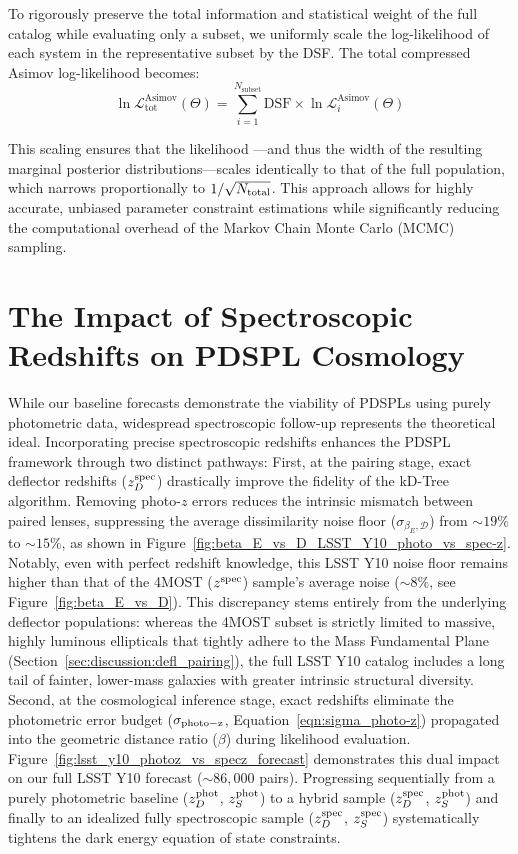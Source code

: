 \documentclass[a4paper,11pt]{article}
\begin{document}
\begin{appendix}
To rigorously preserve the total information and statistical weight of the full catalog while evaluating only a subset, we uniformly scale the log-likelihood of each system in the representative subset by the DSF. The total compressed Asimov log-likelihood becomes:
\begin{equation}
    \ln \mathcal{L}_{\text{tot}}^{\text{Asimov}}(\Theta) = \sum_{i=1}^{N_{\text{subset}}} \mathrm{DSF} \times \ln \mathcal{L}_i^{\text{Asimov}}(\Theta)
\end{equation}

This scaling ensures that the likelihood —and thus the width of the resulting marginal posterior distributions—scales identically to that of the full population, which narrows proportionally to $1/\sqrt{N_{\rm total}}$. This approach allows for highly accurate, unbiased parameter constraint estimations while significantly reducing the computational overhead of the Markov Chain Monte Carlo (MCMC) sampling.

\section{The Impact of Spectroscopic Redshifts on PDSPL Cosmology}\label{app:lsst_y10_photo-z_vs_spec-z}

While our baseline forecasts demonstrate the viability of PDSPLs using purely photometric data, widespread spectroscopic follow-up represents the theoretical ideal. Incorporating precise spectroscopic redshifts enhances the PDSPL framework through two distinct pathways: First, at the pairing stage, exact deflector redshifts ($z_{D}^{\rm spec}$) drastically improve the fidelity of the kD-Tree algorithm. Removing photo-$z$ errors reduces the intrinsic mismatch between paired lenses, suppressing the average dissimilarity noise floor ($\sigma_{\beta_E, \mathcal{D}}$) from $\sim 19\%$ to $\sim 15\%$, as shown in Figure~\ref{fig:beta_E_vs_D_LSST_Y10_photo_vs_spec-z}. Notably, even with perfect redshift knowledge, this LSST Y10 noise floor remains higher than that of the 4MOST ($z^{\rm spec}$) sample's average noise ($\sim 8\%$, see Figure~\ref{fig:beta_E_vs_D}). This discrepancy stems entirely from the underlying deflector populations: whereas the 4MOST subset is strictly limited to massive, highly luminous ellipticals that tightly adhere to the Mass Fundamental Plane (Section~\ref{sec:discussion:defl_pairing}), the full LSST Y10 catalog includes a long tail of fainter, lower-mass galaxies with greater intrinsic structural diversity. Second, at the cosmological inference stage, exact redshifts eliminate the photometric error budget ($\sigma_{\rm photo-z}$, Equation~\ref{eqn:sigma_photo-z}) propagated into the geometric distance ratio ($\beta$) during likelihood evaluation. Figure~\ref{fig:lsst_y10_photoz_vs_specz_forecast} demonstrates this dual impact on our full LSST Y10 forecast ($\sim 86,000$ pairs). Progressing sequentially from a purely photometric baseline ($z_{D}^{\rm phot}$, $z_{S}^{\rm phot}$) to a hybrid sample ($z_{D}^{\rm spec}$, $z_{S}^{\rm phot}$) and finally to an idealized fully spectroscopic sample ($z_{D}^{\rm spec}$, $z_{S}^{\rm spec}$) systematically tightens the dark energy equation of state constraints.


\end{appendix}
\end{document}
